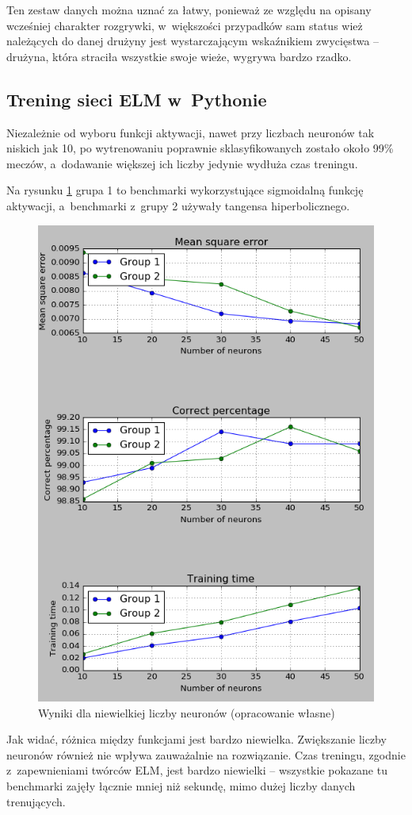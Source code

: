 \documentclass[pl]{minipw} %
\begin{document}
Ten zestaw danych można uznać za łatwy, ponieważ ze względu na opisany wcześniej charakter rozgrywki, w~większości przypadków sam status wież należących do danej drużyny jest wystarczającym wskaźnikiem zwycięstwa -- drużyna, która straciła wszystkie swoje wieże, wygrywa bardzo rzadko.
\subsection{Trening sieci ELM w~Pythonie}
Niezależnie od wyboru funkcji aktywacji, nawet przy liczbach neuronów tak niskich jak 10, po wytrenowaniu poprawnie sklasyfikowanych zostało około 99\% meczów, a~dodawanie większej ich liczby jedynie wydłuża czas treningu. 

Na rysunku \ref{wyniki_dota2_python} grupa 1 to benchmarki wykorzystujące sigmoidalną funkcję aktywacji, a~benchmarki z~grupy 2 używały tangensa hiperbolicznego.

\begin{figure}[H]
\centering
\includegraphics[width=\textwidth]{wyniki_dota2_python.png}
\caption[Wyniki dla niewielkiej liczby neuronów]{Wyniki dla niewielkiej liczby neuronów (opracowanie własne)}
\label{wyniki_dota2_python}
\end{figure}
Jak widać, różnica między funkcjami jest bardzo niewielka. Zwiększanie liczby neuronów również nie wpływa zauważalnie na rozwiązanie. Czas treningu, zgodnie z~zapewnieniami twórców ELM, jest bardzo niewielki -- wszystkie pokazane tu benchmarki zajęły łącznie mniej niż sekundę, mimo dużej liczby danych trenujących. 
\end{document}
